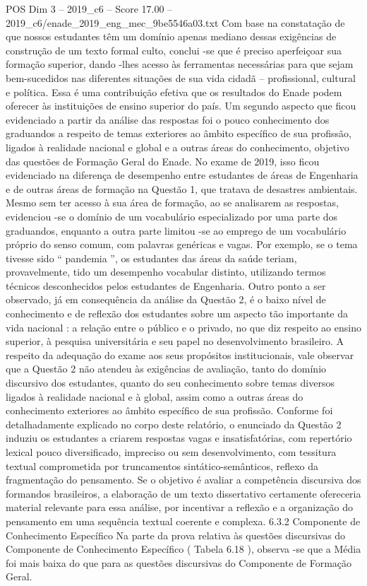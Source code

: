 \begin{textsample}{POS Dim 3 – 2019\_c6 – Score 17.00 – 2019\_c6/enade\_2019\_eng\_mec\_9be5546a03.txt}
Com base na constatação de que nossos estudantes têm um domínio apenas mediano dessas exigências de construção de um texto formal culto, conclui -se que é preciso aperfeiçoar sua formação superior, dando -lhes acesso às ferramentas necessárias para que sejam bem-sucedidos nas diferentes situações de sua vida cidadã – profissional, cultural e política.
Essa é uma contribuição efetiva que os resultados do Enade podem oferecer às instituições de ensino superior do país.
Um segundo aspecto que ficou evidenciado a partir da análise das respostas foi o pouco conhecimento dos graduandos a respeito de temas exteriores ao âmbito específico de sua profissão, ligados à realidade nacional e global e a outras áreas do conhecimento, objetivo das questões de Formação Geral do Enade.
No exame de 2019, isso ficou evidenciado na diferença de desempenho entre estudantes de áreas de Engenharia e de outras áreas de formação na Questão 1, que tratava de desastres ambientais.
Mesmo sem ter acesso à sua área de formação, ao se analisarem as respostas, evidenciou -se o domínio de um vocabulário especializado por uma parte dos graduandos, enquanto a outra parte limitou -se ao emprego de um vocabulário próprio do senso comum, com palavras genéricas e vagas.
Por exemplo, se o tema tivesse sido “ pandemia ”, os estudantes das áreas da saúde teriam, provavelmente, tido um desempenho vocabular distinto, utilizando termos técnicos desconhecidos pelos estudantes de Engenharia.
Outro ponto a ser observado, já em consequência da análise da Questão 2, é o baixo nível de conhecimento e de reflexão dos estudantes sobre um aspecto tão importante da vida nacional : a relação entre o público e o privado, no que diz respeito ao ensino superior, à pesquisa universitária e seu papel no desenvolvimento brasileiro.
A respeito da adequação do exame aos seus propósitos institucionais, vale observar que a Questão 2 não atendeu às exigências de avaliação, tanto do domínio discursivo dos estudantes, quanto do seu conhecimento sobre temas diversos ligados à realidade nacional e à global, assim como a outras áreas do conhecimento exteriores ao âmbito específico de sua profissão.
Conforme foi detalhadamente explicado no corpo deste relatório, o enunciado da Questão 2 induziu os estudantes a criarem respostas vagas e insatisfatórias, com repertório lexical pouco diversificado, impreciso ou sem desenvolvimento, com tessitura textual comprometida por truncamentos sintático-semânticos, reflexo da fragmentação do pensamento.
Se o objetivo é avaliar a competência discursiva dos formandos brasileiros, a elaboração de um texto dissertativo certamente ofereceria material relevante para essa análise, por incentivar a reflexão e a organização do pensamento em uma sequência textual coerente e complexa. 6.3.2 Componente de Conhecimento Específico Na parte da prova relativa às questões discursivas do Componente de Conhecimento Específico ( Tabela 6.18 ), observa -se que a Média foi mais baixa do que para as questões discursivas do Componente de Formação Geral.

\end{textsample}
